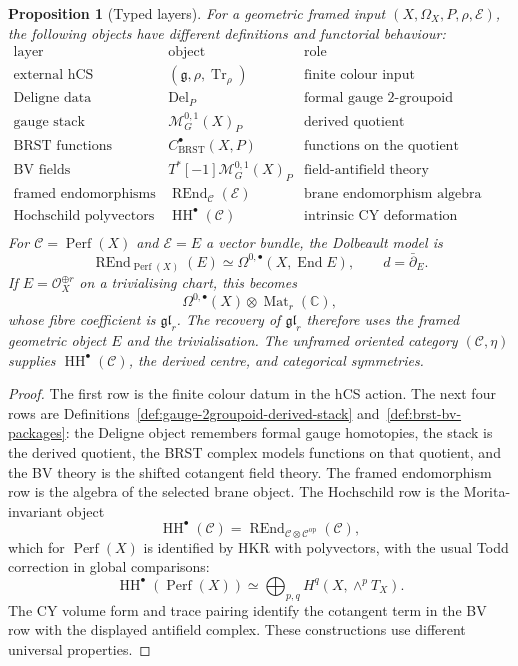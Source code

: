 \documentclass[11pt]{amsart}
\theoremstyle{plain}
\newtheorem{proposition}[theorem]{Proposition}
\theoremstyle{definition}
\theoremstyle{remark}
\providecommand{\C}{\mathbb{C}}
\providecommand{\cC}{\mathcal{C}}
\providecommand{\cE}{\mathcal{E}}
\providecommand{\cM}{\mathcal{M}}
\providecommand{\cO}{\mathcal{O}}
\providecommand{\fg}{\mathfrak{g}}
\providecommand{\fgl}{\mathfrak{gl}}
\providecommand{\HH}{\operatorname{HH}}
\providecommand{\Perf}{\operatorname{Perf}}
\providecommand{\REnd}{\operatorname{REnd}}
\providecommand{\End}{\operatorname{End}}
\providecommand{\Tr}{\operatorname{Tr}}
\providecommand{\Del}{\operatorname{Del}}
\providecommand{\dbar}{\bar\partial}
\begin{document}
\begin{proposition}[Typed layers]
\label{prop:typed-layers}
For a geometric framed input \((X,\Omega_X,P,\rho,\cE)\), the following
objects have different definitions and functorial behaviour:
\[
\begin{array}{c|c|c}
\text{layer} & \text{object} & \text{role}\\
\hline
\text{external hCS coefficient} & (\fg,\rho,\Tr_\rho) & \text{finite colour input}\\
\text{Deligne data} & \Del_P & \text{formal gauge 2-groupoid}\\
\text{gauge stack} & \cM^{0,1}_G(X)_P & \text{derived quotient}\\
\text{BRST functions} & C^\bullet_{\mathrm{BRST}}(X,P) & \text{functions on the quotient}\\
\text{BV fields} & T^\ast[-1]\cM^{0,1}_G(X)_P & \text{field-antifield theory}\\
\text{framed endomorphisms} & \REnd_{\cC}(\cE) & \text{brane endomorphism algebra}\\
\text{Hochschild polyvectors} & \HH^\bullet(\cC) & \text{intrinsic CY deformation complex}\\
\end{array}
\]
For \(\cC=\Perf(X)\) and \(\cE=E\) a vector bundle, the Dolbeault model is
\[
  \REnd_{\Perf(X)}(E)
  \simeq
  \Omega^{0,\bullet}(X,\End E),
  \qquad d=\dbar_E .
\]
If \(E=\cO_X^{\oplus r}\) on a trivialising chart, this becomes
\[
  \Omega^{0,\bullet}(X)\otimes\operatorname{Mat}_r(\C),
\]
whose fibre coefficient is \(\fgl_r\). The recovery of \(\fgl_r\)
therefore uses the framed geometric object \(E\) and the trivialisation.
The unframed oriented category \((\cC,\eta)\) supplies
\(\HH^\bullet(\cC)\), the derived centre, and categorical symmetries.
\end{proposition}

\begin{proof}
The first row is the finite colour datum in the hCS action. The next
four rows are Definitions~\ref{def:gauge-2groupoid-derived-stack}
and~\ref{def:brst-bv-packages}: the Deligne object remembers formal
gauge homotopies, the stack is the derived quotient, the BRST complex
models functions on that quotient, and the BV theory is the shifted
cotangent field theory. The framed endomorphism row is the algebra of
the selected brane object. The Hochschild row is the Morita-invariant
object
\[
  \HH^\bullet(\cC)
  =
  \REnd_{\cC\otimes\cC^{\mathrm{op}}}(\cC),
\]
which for \(\Perf(X)\) is identified by HKR with polyvectors, with the
usual Todd correction in global comparisons:
\[
  \HH^\bullet(\Perf(X))
  \simeq
  \bigoplus_{p,q}H^q(X,\wedge^pT_X).
\]
The CY volume form and trace pairing identify the cotangent term in the
BV row with the displayed antifield complex. These constructions use
different universal properties.
\end{proof}
\end{document}
